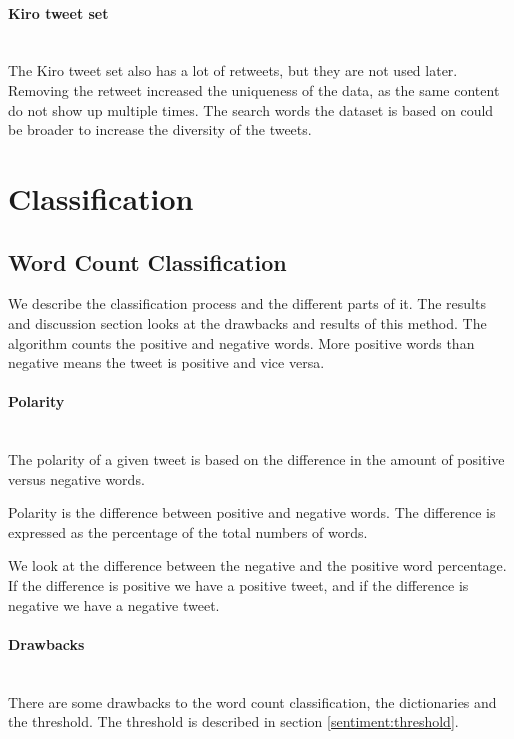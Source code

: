\paragraph{Kiro tweet set}
\hspace{0pt}\\
The Kiro tweet set also has a lot of retweets, but they are not used later.
Removing the retweet increased the uniqueness of the data, as the same content
do not show up multiple times. The search words the dataset is based on
could be broader to increase the diversity of the tweets.
%

\section{Classification}\label{sentiment:classification}
\subsection{Word Count Classification}\label{sentiment:word_count_classification}
We describe the classification process and the different parts of it. The
results and discussion section looks at the drawbacks and results of this method.
The algorithm counts the positive and negative words. More positive words than
negative means the tweet is positive and vice versa. 

\paragraph{Polarity} 
\hspace{0pt}\\ 
The polarity of a given tweet is based on the difference in the amount of
positive versus negative words. 

Polarity is the difference between positive and negative words. The difference is
expressed as the percentage of the total numbers of words.  

We look at the difference between the negative and the positive word
percentage. If the difference is positive we have a positive tweet, and if the
difference is negative we have a negative tweet.

\paragraph{Drawbacks}
\hspace{0pt}\\
There are some drawbacks to the word count classification, the dictionaries
and the threshold. The threshold is described in section
\ref{sentiment:threshold}. 

